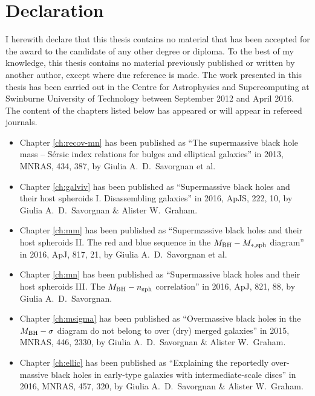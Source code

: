 \chapter*{Declaration}

I herewith declare that this thesis contains no material that has been accepted 
for the award to the candidate of any other degree or diploma. 
To the best of my knowledge, 
this thesis contains no material previously published or written by another author, 
except where due reference is made.
The work presented in this thesis has been carried out 
in the Centre for Astrophysics and Supercomputing 
at Swinburne University of Technology between September 2012 and April 2016. 
The content of the chapters listed below has appeared or will appear in refereed journals. 

\begin{itemize}

\item Chapter \ref{ch:recov-mn} has been published as 
``The supermassive black hole mass -- S\'ersic index relations for bulges and elliptical galaxies''
in 2013, MNRAS, 434, 387, by Giulia A.~D.~Savorgnan et al.

\item Chapter \ref{ch:galviv} has been published as 
``Supermassive black holes and their host spheroids I. Disassembling galaxies'' 
in 2016, ApJS, 222, 10, by Giulia A.~D.~Savorgnan \& Alister W.~Graham. 

\item Chapter \ref{ch:mm} has been published as 
``Supermassive black holes and their host spheroids 
II. The red and blue sequence in the $M_{\rm BH} - M_{\rm *,sph}$ diagram''
in 2016, ApJ, 817, 21, by Giulia A.~D.~Savorgnan et al.

\item Chapter \ref{ch:mn} has been published as 
``Supermassive black holes and their host spheroids 
III. The $M_{\rm BH} - n_{\rm sph}$ correlation''
in 2016, ApJ, 821, 88, by Giulia A.~D.~Savorgnan.

\item Chapter \ref{ch:msigma} has been published as 
``Overmassive black holes in the $M_{\rm BH} - \sigma$ diagram do not belong to over (dry) merged galaxies''
in 2015, MNRAS, 446, 2330, by Giulia A.~D.~Savorgnan \& Alister W.~Graham. 

\item Chapter \ref{ch:ellic} has been published as 
``Explaining the reportedly over-massive black holes in early-type galaxies with intermediate-scale discs'' 
in 2016, MNRAS, 457, 320, by Giulia A.~D.~Savorgnan \& Alister W.~Graham. 

\end{itemize}

